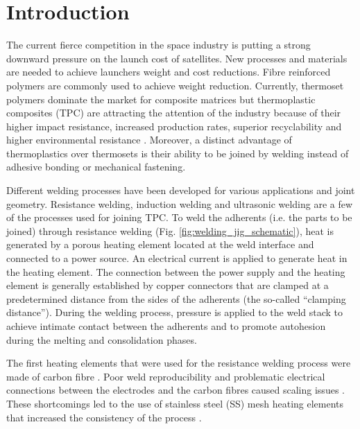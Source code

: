 \documentclass[11pt,review,times]{elsarticle}
\begin{document}
							\section{Introduction}

The current fierce competition in the space industry is putting a strong downward pressure on the launch cost of satellites. 
New processes and materials are needed to achieve launchers weight and cost reductions. 
Fibre reinforced polymers are commonly used to achieve weight reduction. 
Currently, thermoset polymers dominate the market for composite matrices but thermoplastic composites (TPC) are attracting the attention of the industry \cite{CompositeWorldSloan2018} because of their higher impact resistance, increased production rates, superior recyclability and higher environmental resistance \cite{cogswell1992}. 
Moreover, a distinct advantage of thermoplastics over thermosets is their ability to be joined by welding instead of adhesive bonding or mechanical fastening. 

Different welding processes have been developed for various applications and joint geometry. 
Resistance welding, induction welding and ultrasonic welding are a few of the processes used for joining TPC. 
To weld the adherents (i.e. the parts to be joined) through resistance welding (Fig. \ref{fig:welding_jig_schematic}), heat is generated by a porous heating element located at the weld interface and connected to a power source. 
An electrical current is applied to generate heat in the heating element. 
The connection between the power supply and the heating element is generally established by copper connectors that are clamped at a predetermined distance from the sides of the adherents (the so-called “clamping distance”). 
During the welding process, pressure is applied to the weld stack to achieve intimate contact between the adherents and to promote autohesion during the melting and consolidation phases. 

The first heating elements that were used for the resistance welding process were made of carbon fibre  \cite{Ageorges2000a,houghton1984bonding,Eveno1988}.
Poor weld reproducibility and problematic electrical connections between the electrodes and the carbon fibres caused scaling issues \cite{McKnight1997}. 
These shortcomings led to the use of stainless steel (SS) mesh heating elements that increased the consistency of the process \cite{Hou1999a}.
\end{document}
